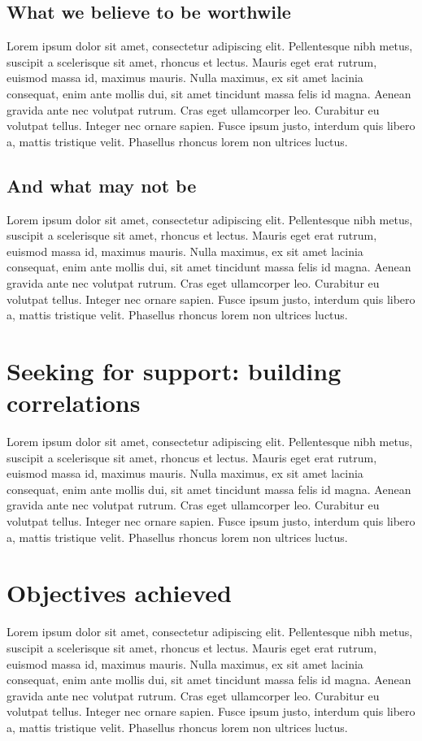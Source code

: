 \subsection{What we believe to be worthwile}\label{sec:worthwile}
Lorem ipsum dolor sit amet, consectetur adipiscing elit. Pellentesque nibh metus, suscipit a scelerisque sit amet, rhoncus et lectus. Mauris eget erat rutrum, euismod massa id, maximus mauris. Nulla maximus, ex sit amet lacinia consequat, enim ante mollis dui, sit amet tincidunt massa felis id magna. Aenean gravida ante nec volutpat rutrum. Cras eget ullamcorper leo. Curabitur eu volutpat tellus. Integer nec ornare sapien. Fusce ipsum justo, interdum quis libero a, mattis tristique velit. Phasellus rhoncus lorem non ultrices luctus.

\subsection{And what may not be}\label{sec:notworthwile}
Lorem ipsum dolor sit amet, consectetur adipiscing elit. Pellentesque nibh metus, suscipit a scelerisque sit amet, rhoncus et lectus. Mauris eget erat rutrum, euismod massa id, maximus mauris. Nulla maximus, ex sit amet lacinia consequat, enim ante mollis dui, sit amet tincidunt massa felis id magna. Aenean gravida ante nec volutpat rutrum. Cras eget ullamcorper leo. Curabitur eu volutpat tellus. Integer nec ornare sapien. Fusce ipsum justo, interdum quis libero a, mattis tristique velit. Phasellus rhoncus lorem non ultrices luctus.

\section{Seeking for support: building correlations}\label{sec:seekingforsupport}
Lorem ipsum dolor sit amet, consectetur adipiscing elit. Pellentesque nibh metus, suscipit a scelerisque sit amet, rhoncus et lectus. Mauris eget erat rutrum, euismod massa id, maximus mauris. Nulla maximus, ex sit amet lacinia consequat, enim ante mollis dui, sit amet tincidunt massa felis id magna. Aenean gravida ante nec volutpat rutrum. Cras eget ullamcorper leo. Curabitur eu volutpat tellus. Integer nec ornare sapien. Fusce ipsum justo, interdum quis libero a, mattis tristique velit. Phasellus rhoncus lorem non ultrices luctus.

\section{Objectives achieved}\label{secd:objectivesachieved}
Lorem ipsum dolor sit amet, consectetur adipiscing elit. Pellentesque nibh metus, suscipit a scelerisque sit amet, rhoncus et lectus. Mauris eget erat rutrum, euismod massa id, maximus mauris. Nulla maximus, ex sit amet lacinia consequat, enim ante mollis dui, sit amet tincidunt massa felis id magna. Aenean gravida ante nec volutpat rutrum. Cras eget ullamcorper leo. Curabitur eu volutpat tellus. Integer nec ornare sapien. Fusce ipsum justo, interdum quis libero a, mattis tristique velit. Phasellus rhoncus lorem non ultrices luctus.

